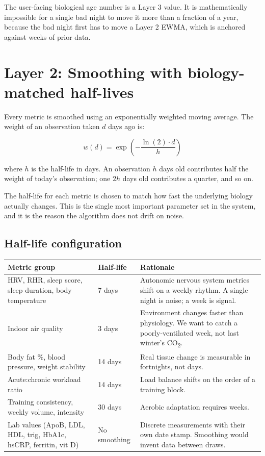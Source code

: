 \documentclass[11pt, a4paper]{article}
\begin{document}
The user-facing biological age number is a Layer 3 value. It is mathematically impossible for a single bad night to move it more than a fraction of a year, because the bad night first has to move a Layer 2 EWMA, which is anchored against weeks of prior data.

\section{Layer 2: Smoothing with biology-matched half-lives}

Every metric is smoothed using an exponentially weighted moving average. The weight of an observation taken $d$ days ago is:

\begin{equation}
w(d) = \exp\left(-\frac{\ln(2) \cdot d}{h}\right)
\end{equation}

where $h$ is the half-life in days. An observation $h$ days old contributes half the weight of today's observation; one $2h$ days old contributes a quarter, and so on.

The half-life for each metric is chosen to match how fast the underlying biology actually changes. This is the single most important parameter set in the system, and it is the reason the algorithm does not drift on noise.

\subsection{Half-life configuration}

\vspace{0.3em}
\noindent
\begin{tabularx}{\linewidth}{@{} L{4.8cm} L{2.0cm} X @{}}
\toprule
\textbf{Metric group} & \textbf{Half-life} & \textbf{Rationale} \\
\midrule
HRV, RHR, sleep score, sleep duration, body temperature & 7 days & Autonomic nervous system metrics shift on a weekly rhythm. A single night is noise; a week is signal. \\
Indoor air quality & 3 days & Environment changes faster than physiology. We want to catch a poorly-ventilated week, not last winter's CO\textsubscript{2}. \\
Body fat \%, blood pressure, weight stability & 14 days & Real tissue change is measurable in fortnights, not days. \\
Acute:chronic workload ratio & 14 days & Load balance shifts on the order of a training block. \\
Training consistency, weekly volume, intensity & 30 days & Aerobic adaptation requires weeks. \\
Lab values (ApoB, LDL, HDL, trig, HbA1c, hsCRP, ferritin, vit D) & No smoothing & Discrete measurements with their own date stamp. Smoothing would invent data between draws. \\
\bottomrule
\end{tabularx}
\vspace{0.5em}
\end{document}
